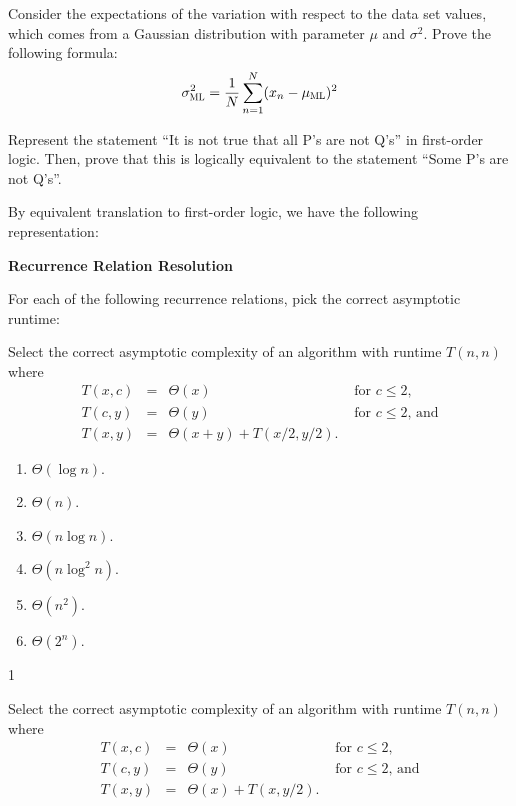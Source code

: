 \documentclass[12pt,twoside]{article}
\begin{document}
\begin{exercises}

\problem

Consider the expectations of the variation with respect to the data
set values, which comes from a Gaussian distribution with parameter
$\mu$ and $\sigma^2$. Prove the following formula: 
\hspace*{-1em}
$$\sigma_{\scalebox{0.7}{ML}}^2 = \frac{1}{N} \sum_{n=1}^{N} (x_n - \mu_{\scalebox{0.7}{ML}})^2 $$

Represent the statement ``It is not true that all P's are not Q's'' in
first-order logic. Then, prove that this is logically equivalent to the
statement ``Some P's are not Q's''.

\ifsolution \solution{}
By equivalent translation to first-order logic, we have the following
representation:
\fi

\problem {} \textbf{Recurrence Relation Resolution}

For each of the following recurrence relations,
pick the correct asymptotic runtime:

\begin{exerciseparts}

\problempart {}
Select the correct asymptotic complexity
of an algorithm with runtime $T(n, n)$
where 
$$
\begin{array}{rcll}
T(x, c) &=& \Theta(x) & \textrm{ for $c \le 2$}, \\
T(c, y) &=& \Theta(y) & \textrm{ for $c \le 2$, and} \\
T(x, y) &=& \Theta(x + y) + T(x / 2, y / 2).
\end{array}
$$

\begin{enumerate}
\item $\Theta(\log n)$.
\item $\Theta(n)$.
\item $\Theta(n \log n)$.
\item $\Theta(n \log^2 n)$.
\item $\Theta(n^2)$.
\item $\Theta(2^n)$.
\end{enumerate}

\ifsolution \solution{}
1
\fi

\problempart {}
Select the correct asymptotic complexity
of an algorithm with runtime $T(n, n)$
where 
$$
\begin{array}{rcll}
T(x, c) &=& \Theta(x) & \textrm{ for $c \le 2$}, \\
T(c, y) &=& \Theta(y) & \textrm{ for $c \le 2$, and} \\
T(x, y) &=& \Theta(x) + T(x, y / 2).
\end{array}
$$


\end{exerciseparts}
\end{exercises}
\end{document}
